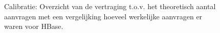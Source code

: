 \begin{figure}[h!] 
	\centering
	\caption{Calibratie: Overzicht van de vertraging t.o.v. het theoretisch aantal aanvragen met een vergelijking hoeveel werkelijke aanvragen er waren voor HBase. }
	\label{fig:calibratie-queriesperseconde-hbase}
\end{figure}

